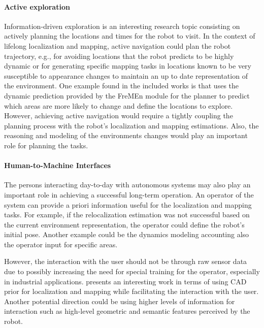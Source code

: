 \paragraph{Active exploration}

Information-driven exploration is an interesting research topic consisting on actively planning the locations and times for the robot to visit. In the context of lifelong localization and mapping, active navigation could plan the robot trajectory, e.g., for avoiding locations that the robot predicts to be highly dynamic or for generating specific mapping tasks in locations known to be very susceptible to appearance changes to maintain an up to date representation of the environment.
One example found in the included works is \cite{santos-et-al:2016:2516594} that uses the dynamic prediction provided by the FreMEn module for the planner to predict which areas are more likely to change and define the locations to explore.
However, achieving active navigation would require a tightly coupling the planning process with the robot's localization and mapping estimations. Also, the reasoning and modeling of the environments changes would play an important role for planning the tasks.



\paragraph{Human-to-Machine Interfaces}

The persons interacting day-to-day with autonomous systems may also play an important role in achieving a successful long-term operation. An operator of the system can provide a priori information useful for the localization and mapping tasks. For example, if the relocalization estimation was not successful based on the current environment representation, the operator could define the robot's initial pose. Another example could be the dynamics modeling accounting also the operator input for specific areas.

However, the interaction with the user should not be through raw sensor data due to possibly increasing the need for special training for the operator, especially in industrial applications. \cite{boniardi-et-al:2019:003} presents an interesting work in terms of using CAD prior for localization and mapping while facilitating the interaction with the user. Another potential direction could be using higher levels of information for interaction such as high-level geometric and semantic features perceived by the robot.
